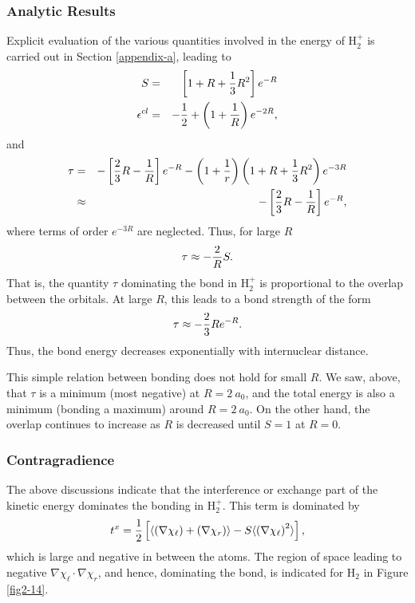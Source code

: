 \medskip

\subsubsection{Analytic Results}

Explicit evaluation of the various quantities involved in the energy of
H$^+_2$ is carried out in Section \ref{appendix-a}, leading to
\begin{eqnarray*}
S &=& \left[ 1 + R + {1 \over 3} R^2 \right] e^{-R}\cr
\epsilon^{cl} &=& - {1 \over 2} + \left( 1 + {1 \over R} \right) 
e^{-2R},\cr
\end{eqnarray*}
and
\begin{eqnarray*}
\tau &=& - \left[ {2 \over 3} R - {1 \over R} \right] e^{-R} - \left( 
1 + {1 \over r} \right) \left( 1 + R + {1 \over 3} R^2 \right) 
e^{-3R}\cr
&\approx&  - \left[ {2 \over 3} R - {1 \over R} \right] e^{-R},\cr
\end{eqnarray*}
where terms of order $e^{-3R}$ are neglected. Thus, for large $R$
\begin{equation}
\tau \approx - {2 \over R} S.
\end{equation}
That is, the quantity $\tau$ dominating the bond in H$^+_2$ is 
proportional to the overlap between the orbitals. At large $R$, this 
leads to a bond strength of the form
\begin{equation}
\tau \approx - {2 \over 3} Re^{-R}.
\end{equation}
Thus, the bond energy decreases exponentially with internuclear distance.
    
This simple relation between bonding does not hold for small $R$.  We
saw, above, that $\tau$ is a minimum (most negative) at $R = 2\ a_0$,
and the total energy is also a minimum (bonding a maximum) around $R =
2\ a_0$. On the other hand, the overlap continues to increase as $R$
is decreased until $S = 1$ at $R = 0$.

\subsubsection{Contragradience}
    
The above discussions indicate that the interference or exchange part of the
kinetic energy dominates the bonding in H$^+_2$. This term is dominated by
\begin{equation}
t^x = {1 \over 2} \left[ \langle \left( \nabla \chi_\ell \right) + 
\left( \nabla \chi_r \right) \rangle - S \langle \left( \nabla 
\chi_\ell \right)^2 \rangle \right],
\end{equation}
which is large and negative in between the atoms. The region of space leading
to negative $\nabla \chi_\ell \cdot \nabla \chi_r$, and hence, dominating the 
bond, is indicated for H$_2$ in Figure \ref{fig2-14}.

